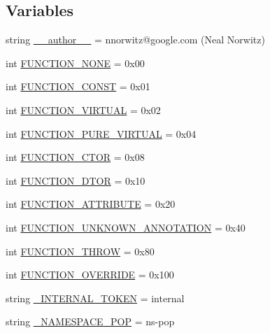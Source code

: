 \subsection*{Variables}
\begin{DoxyCompactItemize}
\item 
string \hyperlink{namespacecpp_1_1ast_aa0742cad7ac7285ad26b163812fc1b94}{\+\_\+\+\_\+author\+\_\+\+\_\+} = \textquotesingle{}nnorwitz@google.\+com (Neal Norwitz)\textquotesingle{}
\item 
int \hyperlink{namespacecpp_1_1ast_a8f1229df8e1348664a7e6142c2d0ae0b}{F\+U\+N\+C\+T\+I\+O\+N\+\_\+\+N\+O\+NE} = 0x00
\item 
int \hyperlink{namespacecpp_1_1ast_a73fe57808e7f2e3f3e9d0e1088f183be}{F\+U\+N\+C\+T\+I\+O\+N\+\_\+\+C\+O\+N\+ST} = 0x01
\item 
int \hyperlink{namespacecpp_1_1ast_a7d444baf6763d374aa4ef9c3f0e6d5b3}{F\+U\+N\+C\+T\+I\+O\+N\+\_\+\+V\+I\+R\+T\+U\+AL} = 0x02
\item 
int \hyperlink{namespacecpp_1_1ast_ae8f597c9a3e49e1a29e8da1848d40ff1}{F\+U\+N\+C\+T\+I\+O\+N\+\_\+\+P\+U\+R\+E\+\_\+\+V\+I\+R\+T\+U\+AL} = 0x04
\item 
int \hyperlink{namespacecpp_1_1ast_ae380e31bf1bce9757f3289a704715c2d}{F\+U\+N\+C\+T\+I\+O\+N\+\_\+\+C\+T\+OR} = 0x08
\item 
int \hyperlink{namespacecpp_1_1ast_a4491e62237a2689be078bf3b455549e6}{F\+U\+N\+C\+T\+I\+O\+N\+\_\+\+D\+T\+OR} = 0x10
\item 
int \hyperlink{namespacecpp_1_1ast_a6462424cd2b9884f63bf7594811321cd}{F\+U\+N\+C\+T\+I\+O\+N\+\_\+\+A\+T\+T\+R\+I\+B\+U\+TE} = 0x20
\item 
int \hyperlink{namespacecpp_1_1ast_a9d3ba548a6c733892e60c8accdc96639}{F\+U\+N\+C\+T\+I\+O\+N\+\_\+\+U\+N\+K\+N\+O\+W\+N\+\_\+\+A\+N\+N\+O\+T\+A\+T\+I\+ON} = 0x40
\item 
int \hyperlink{namespacecpp_1_1ast_a3384f360da38e3df526d189238118fb5}{F\+U\+N\+C\+T\+I\+O\+N\+\_\+\+T\+H\+R\+OW} = 0x80
\item 
int \hyperlink{namespacecpp_1_1ast_aecf2f8a17fb10fe367d2da84849c06c9}{F\+U\+N\+C\+T\+I\+O\+N\+\_\+\+O\+V\+E\+R\+R\+I\+DE} = 0x100
\item 
string \hyperlink{namespacecpp_1_1ast_aea75be79d23641b8d6b405544181cbed}{\+\_\+\+I\+N\+T\+E\+R\+N\+A\+L\+\_\+\+T\+O\+K\+EN} = \textquotesingle{}internal\textquotesingle{}
\item 
string \hyperlink{namespacecpp_1_1ast_a35d68f08f8c54c2e22a1757e3899eb59}{\+\_\+\+N\+A\+M\+E\+S\+P\+A\+C\+E\+\_\+\+P\+OP} = \textquotesingle{}ns-\/pop\textquotesingle{}
\end{DoxyCompactItemize}



